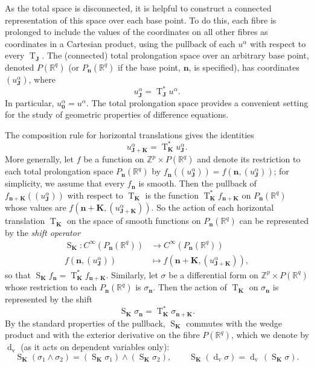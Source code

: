 \documentclass[11pt]{article} %
\numberwithin{equation}{section}
\newcommand{\es}{\operatorname{S}}
\newcommand{\te}{\operatorname{T}}
\newcommand{\teJ}{\te_\mathbf{J}}
\newcommand{\teK}{\te_\mathbf{K}}
\newcommand{\upd}{\operatorname{d}}
\newcommand{\upv}{\operatorname{v}}
\newcommand{\dv}{\upd_{\upv}\!}
\newcommand{\mbn}{\mathbf{n}}
\newcommand{\mbJ}{\mathbf{J}}
\newcommand{\mbK}{\mathbf{K}}
\theoremstyle{plain}
\theoremstyle{definition}
\begin{document}
As the total space is disconnected, it is helpful to construct a connected representation of this space over each base point. To do this, each fibre is prolonged to include the values of the coordinates on all other fibres as coordinates in a Cartesian product, using the pullback of each $u^\alpha$ with respect to every $\teJ$. The (connected) total prolongation space over an arbitrary base point, denoted $P(\mathbb{R}^q)$ (or $P_\mbn(\mathbb{R}^q)$ if the base point, $\mbn$, is specified), has coordinates $(u^\alpha_{\mbJ})$, where
\[
u^\alpha_{\mbJ}=\teJ^*\!u^\alpha.
\]
In particular, $u^{\alpha}_{\mathbf{0}}=u^{\alpha}$. The total prolongation space provides a convenient setting for the study of  geometric properties of difference equations.

The composition rule for horizontal translations gives the identities
\[
u^\alpha_{\mbJ+\mbK}=\teK^*\!u^\alpha_{\mbJ}.
\]
More generally, let $f$ be a function on $\mathbb{Z}^p\times P(\mathbb{R}^q)$ and denote its restriction to each total prolongation space $P_{\mbn}(\mathbb{R}^q)$ by $f_\mbn((u^{\alpha}_{\mbJ}))=f(\mbn,(u^{\alpha}_{\mbJ}))$; for simplicity, we assume that every $f_\mbn$ is smooth. Then the pullback of $f_{\mbn+\mbK}((u^{\alpha}_{\mbJ}))$ with respect to $\te_{\mbK}$ is the function $\te_{\mbK}^*\!f_{\mbn+\mbK}$ on $P_{\mbn}(\mathbb{R}^q)$ whose values are $f(\mbn+\mbK,(u^{\alpha}_{\mbJ+\mbK}))$. So the action of each horizontal translation $\te_{\mbK}$ on the space of smooth functions on $P_{\mbn}(\mathbb{R}^q)$ can be represented by the \textit{shift operator}
\begin{equation}
\begin{aligned}
\es_{\mbK}:C^\infty(P_\mbn(\mathbb{R}^q))&\rightarrow C^\infty(P_\mbn(\mathbb{R}^q))\\
f(\mbn,(u^{\alpha}_{\mbJ}))&\mapsto f(\mbn+\mbK,(u^{\alpha}_{\mbJ+\mbK})),
\end{aligned}
\end{equation}
so that $\es_{\mbK}\!f_\mbn=\te_{\mbK}^*\!f_{\mbn+\mbK}$. Similarly, let $\sigma$ be a differential form on $\mathbb{Z}^p\times P(\mathbb{R}^q)$ whose restriction to each $P_{\mbn}(\mathbb{R}^q)$ is $\sigma_\mbn$. Then the action of $\te_{\mbK}$ on $\sigma_\mbn$ is represented by the shift
\begin{equation}
\es_{\mbK}\!\sigma_\mbn=\te_{\mbK}^*\!\sigma_{\mbn+\mbK}.
\end{equation}
By the standard properties of the pullback, $\es_\mbK$ commutes with the wedge product and with the exterior derivative on the fibre $P(\mathbb{R}^q)$, which we denote by $\dv $ (as it acts on dependent variables only):
\begin{equation}\label{sids}
\es_\mbK(\sigma_1\wedge\sigma_2)=(\es_\mbK\!\sigma_1)\wedge(\es_\mbK\!\sigma_2),\qquad\es_\mbK(\dv \sigma)=\dv\,(\es_\mbK\!\sigma).
\end{equation}
\end{document}
